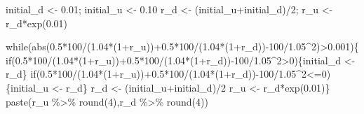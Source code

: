 \documentclass[
  a4paper,
  DIV=11,
  numbers=noendperiod]{scrreprt}
\newenvironment{Shaded}{\begin{snugshade}}{\end{snugshade}}
\newcommand{\ControlFlowTok}[1]{\textcolor[rgb]{0.00,0.23,0.31}{#1}}
\newcommand{\DecValTok}[1]{\textcolor[rgb]{0.68,0.00,0.00}{#1}}
\newcommand{\FloatTok}[1]{\textcolor[rgb]{0.68,0.00,0.00}{#1}}
\newcommand{\FunctionTok}[1]{\textcolor[rgb]{0.28,0.35,0.67}{#1}}
\newcommand{\NormalTok}[1]{\textcolor[rgb]{0.00,0.23,0.31}{#1}}
\newcommand{\OtherTok}[1]{\textcolor[rgb]{0.00,0.23,0.31}{#1}}
\newcommand{\SpecialCharTok}[1]{\textcolor[rgb]{0.37,0.37,0.37}{#1}}
\begin{document}
\begin{Shaded}
\begin{Highlighting}[]
\NormalTok{initial\_d }\OtherTok{\textless{}{-}} \FloatTok{0.01}\NormalTok{; initial\_u }\OtherTok{\textless{}{-}} \FloatTok{0.10}
\NormalTok{r\_d }\OtherTok{\textless{}{-}}\NormalTok{ (initial\_u}\SpecialCharTok{+}\NormalTok{initial\_d)}\SpecialCharTok{/}\DecValTok{2}\NormalTok{; r\_u }\OtherTok{\textless{}{-}}\NormalTok{ r\_d}\SpecialCharTok{*}\FunctionTok{exp}\NormalTok{(}\FloatTok{0.01}\NormalTok{)}

\ControlFlowTok{while}\NormalTok{(}\FunctionTok{abs}\NormalTok{(}\FloatTok{0.5}\SpecialCharTok{*}\DecValTok{100}\SpecialCharTok{/}\NormalTok{(}\FloatTok{1.04}\SpecialCharTok{*}\NormalTok{(}\DecValTok{1}\SpecialCharTok{+}\NormalTok{r\_u))}\SpecialCharTok{+}\FloatTok{0.5}\SpecialCharTok{*}\DecValTok{100}\SpecialCharTok{/}\NormalTok{(}\FloatTok{1.04}\SpecialCharTok{*}\NormalTok{(}\DecValTok{1}\SpecialCharTok{+}\NormalTok{r\_d))}\SpecialCharTok{{-}}\DecValTok{100}\SpecialCharTok{/}\FloatTok{1.05}\SpecialCharTok{\^{}}\DecValTok{2}\NormalTok{)}\SpecialCharTok{\textgreater{}}\FloatTok{0.001}\NormalTok{)\{}
  \ControlFlowTok{if}\NormalTok{(}\FloatTok{0.5}\SpecialCharTok{*}\DecValTok{100}\SpecialCharTok{/}\NormalTok{(}\FloatTok{1.04}\SpecialCharTok{*}\NormalTok{(}\DecValTok{1}\SpecialCharTok{+}\NormalTok{r\_u))}\SpecialCharTok{+}\FloatTok{0.5}\SpecialCharTok{*}\DecValTok{100}\SpecialCharTok{/}\NormalTok{(}\FloatTok{1.04}\SpecialCharTok{*}\NormalTok{(}\DecValTok{1}\SpecialCharTok{+}\NormalTok{r\_d))}\SpecialCharTok{{-}}\DecValTok{100}\SpecialCharTok{/}\FloatTok{1.05}\SpecialCharTok{\^{}}\DecValTok{2}\SpecialCharTok{\textgreater{}}\DecValTok{0}\NormalTok{)\{initial\_d }\OtherTok{\textless{}{-}}\NormalTok{ r\_d\}}
  \ControlFlowTok{if}\NormalTok{(}\FloatTok{0.5}\SpecialCharTok{*}\DecValTok{100}\SpecialCharTok{/}\NormalTok{(}\FloatTok{1.04}\SpecialCharTok{*}\NormalTok{(}\DecValTok{1}\SpecialCharTok{+}\NormalTok{r\_u))}\SpecialCharTok{+}\FloatTok{0.5}\SpecialCharTok{*}\DecValTok{100}\SpecialCharTok{/}\NormalTok{(}\FloatTok{1.04}\SpecialCharTok{*}\NormalTok{(}\DecValTok{1}\SpecialCharTok{+}\NormalTok{r\_d))}\SpecialCharTok{{-}}\DecValTok{100}\SpecialCharTok{/}\FloatTok{1.05}\SpecialCharTok{\^{}}\DecValTok{2}\SpecialCharTok{\textless{}=}\DecValTok{0}\NormalTok{)\{initial\_u }\OtherTok{\textless{}{-}}\NormalTok{ r\_d\}}
\NormalTok{  r\_d }\OtherTok{\textless{}{-}}\NormalTok{ (initial\_u}\SpecialCharTok{+}\NormalTok{initial\_d)}\SpecialCharTok{/}\DecValTok{2}
\NormalTok{  r\_u }\OtherTok{\textless{}{-}}\NormalTok{ r\_d}\SpecialCharTok{*}\FunctionTok{exp}\NormalTok{(}\FloatTok{0.01}\NormalTok{)\}}
\FunctionTok{paste}\NormalTok{(r\_u }\SpecialCharTok{\%\textgreater{}\%} \FunctionTok{round}\NormalTok{(}\DecValTok{4}\NormalTok{),r\_d }\SpecialCharTok{\%\textgreater{}\%} \FunctionTok{round}\NormalTok{(}\DecValTok{4}\NormalTok{))}
\end{Highlighting}
\end{Shaded}
\end{document}

